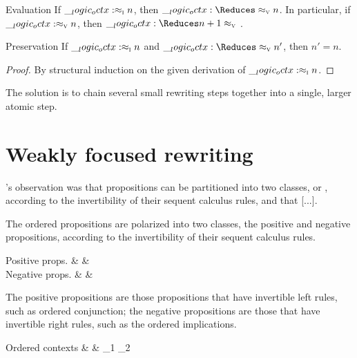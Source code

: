 \begin{theorem}
  \begin{thmdescription}
  \item[Evaluation]
    If $\__logic_octx: \approx\sb{\text{\normalfont\scshape i}} n$, then $\octx \Reduces\aval{}{n}$.
    In particular, if $\__logic_octx: \approx\sb{\text{\normalfont\scshape v}} n$, then $\octx \Reduces\aval{n+1}$.
  \item[Preservation]
    If $\__logic_octx: \approx\sb{\text{\normalfont\scshape i}} n$ and $\octx \Reduces\aval{}{n'}$, then $n' = n$.
  \end{thmdescription}
\end{theorem}
\begin{proof}
  By structural induction on the given derivation of $\__logic_octx: \approx\sb{\text{\normalfont\scshape i}} n$.
\end{proof}

The solution is to chain several small rewriting steps together into a single, larger atomic step. 


\section{Weakly focused rewriting}

\Textcite{Andreoli:??}'s observation was that propositions can be partitioned into two classes, or , according to the invertibility of their sequent calculus rules, and that [...].



The ordered propositions are polarized into two classes, the positive and negative propositions, according to the invertibility of their sequent calculus rules.
\begin{syntax*}
  Positive props. &
     & \p{\alpha} \mid {} \fuse {} \mid \one \mid \dn {}
  \\
  Negative props. &
     & \n{\alpha} \mid
               \limp {} \mid {} \pmir {} \mid %
               \with {} \mid \top \mid \up {}
\end{syntax*}
The positive propositions are those propositions that have invertible left rules, such as ordered conjunction;
the negative propositions are those that have invertible right rules, such as the ordered implications.

\begin{syntax*}
  Ordered contexts &
    \octx & \octx_1 \oc \octx_2 \mid \octxe \mid {}
\end{syntax*}

